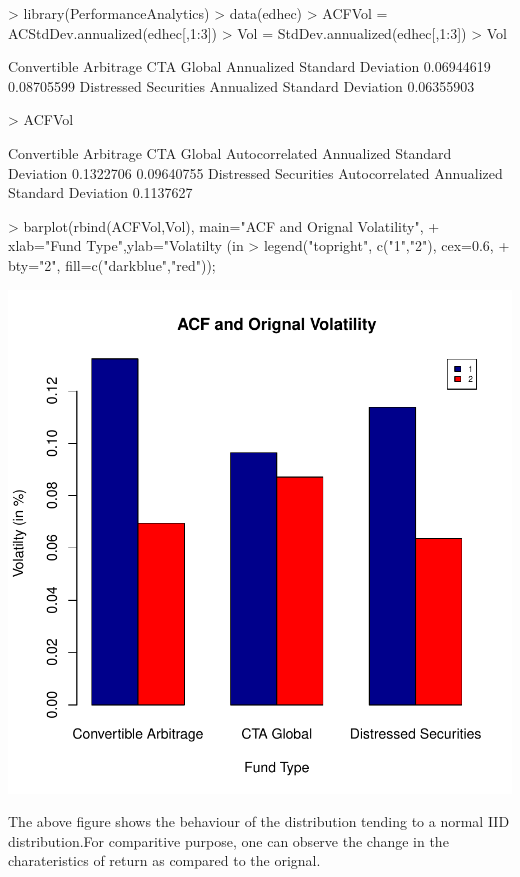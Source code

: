\documentclass[12pt,letterpaper,english]{article}
\begin{document}
\begin{Schunk}
\begin{Sinput}
> library(PerformanceAnalytics)
> data(edhec)
> ACFVol = ACStdDev.annualized(edhec[,1:3])
> Vol = StdDev.annualized(edhec[,1:3])
> Vol
\end{Sinput}
\begin{Soutput}
                              Convertible Arbitrage CTA Global
Annualized Standard Deviation            0.06944619 0.08705599
                              Distressed Securities
Annualized Standard Deviation            0.06355903
\end{Soutput}
\begin{Sinput}
> ACFVol
\end{Sinput}
\begin{Soutput}
                                             Convertible Arbitrage CTA Global
Autocorrelated Annualized Standard Deviation             0.1322706 0.09640755
                                             Distressed Securities
Autocorrelated Annualized Standard Deviation             0.1137627
\end{Soutput}
\begin{Sinput}
> barplot(rbind(ACFVol,Vol), main="ACF and Orignal Volatility",
+          xlab="Fund Type",ylab="Volatilty (in %
>    legend("topright", c("1","2"), cex=0.6, 
+                    bty="2", fill=c("darkblue","red"));
\end{Sinput}
\end{Schunk}
\includegraphics{ACFSTDEV-Graph10}

The above figure shows the behaviour of the distribution tending to a normal IID distribution.For comparitive purpose, one can observe the change in the charateristics of return as compared to the orignal.
\end{document}
